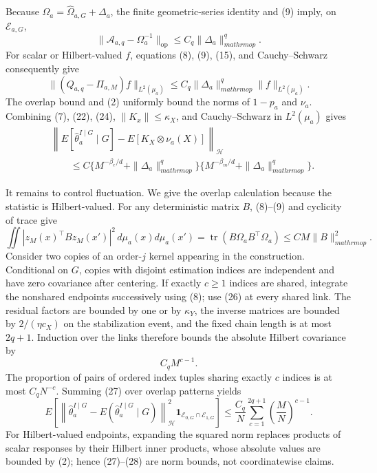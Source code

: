 Because
\(
 \Omega_a=\widehat\Omega_{a,G}+\Delta_a
\), the finite geometric-series identity and (9) imply, on \(\mathcal E_{a,G}\),
\[
 \|\mathcal A_{a,q}-\Omega_a^{-1}\|_{\mathrm{op}}
 \leq C_q\|\Delta_a\|_{mathrm{op}}^q.
 \tag{23}
\]
For scalar or Hilbert-valued \(f\), equations (8), (9), (15), and Cauchy--Schwarz consequently give
\[
 \|(Q_{a,q}-\Pi_{a,M})f\|_{L^2(\mu_a)}
 \leq C_q\|\Delta_a\|_{mathrm{op}}^q
       \|f\|_{L^2(\mu_a)}.
 \tag{24}
\]
The overlap bound and (2) uniformly bound the norms of \(1-p_a\) and \(\nu_a\).  Combining (7), (22), (24), \(\|K_x\|\leq\kappa_X\), and Cauchy--Schwarz in \(L^2(\mu_a)\) gives
\[
 \begin{aligned}
 &\left\|E[\widehat\theta_a^{I\mid G}\mid G]
       -E[K_X\otimes\nu_a(X)]\right\|_{\mathcal H}\\
 &\qquad\leq
 C\{M^{-\beta_e/d}+\|\Delta_a\|_{mathrm{op}}^q\}
  \{M^{-\beta_m/d}+\|\Delta_a\|_{mathrm{op}}^q\}.
 \end{aligned}
 \tag{25}
\]

It remains to control fluctuation.  We give the overlap calculation because the statistic is Hilbert-valued.  For any deterministic matrix \(B\), (8)--(9) and cyclicity of trace give
\[
 \iint|z_M(x)^\top Bz_M(x')|^2
       \,d\mu_a(x)d\mu_a(x')
 =\operatorname{tr}(B\Omega_aB^\top\Omega_a)
 \leq CM\|B\|_{mathrm{op}}^2.
 \tag{26}
\]
Consider two copies of an order-\(j\) kernel appearing in the construction.  Conditional on \(G\), copies with disjoint estimation indices are independent and have zero covariance after centering.  If exactly \(c\geq1\) indices are shared, integrate the nonshared endpoints successively using (8); use (26) at every shared link.  The residual factors are bounded by one or by \(\kappa_Y\), the inverse matrices are bounded by \(2/(\eta c_X)\) on the stabilization event, and the fixed chain length is at most \(2q+1\).  Induction over the links therefore bounds the absolute Hilbert covariance by
\[
 C_qM^{c-1}.
 \tag{27}
\]
The proportion of pairs of ordered index tuples sharing exactly \(c\) indices is at most \(C_qN^{-c}\).  Summing (27) over overlap patterns yields
\[
 E\!\left[
  \left\|\widehat\theta_a^{I\mid G}
    -E(\widehat\theta_a^{I\mid G}\mid G)\right\|_{\mathcal H}^2
  \mathbf 1_{\mathcal E_{0,G}\cap\mathcal E_{1,G}}
 \right]
 \leq\frac{C_q}{N}
       \sum_{c=1}^{2q+1}\left(\frac{M}{N}\right)^{c-1}.
 \tag{28}
\]
For Hilbert-valued endpoints, expanding the squared norm replaces products of scalar responses by their Hilbert inner products, whose absolute values are bounded by (2); hence (27)--(28) are norm bounds, not coordinatewise claims.

